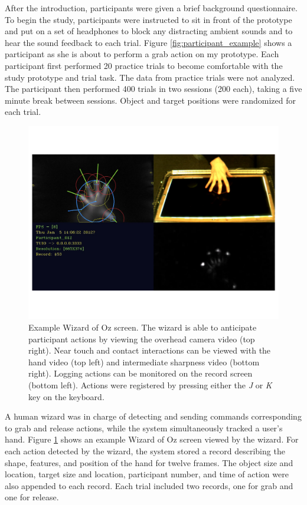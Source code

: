 After the introduction, participants were given a brief background questionnaire.
To begin the study, participants were instructed to sit in front of the prototype and put on a set of headphones to block any distracting ambient sounds and to hear the sound feedback to each trial.
Figure \ref{fig:participant_example} shows a participant as she is about to perform a grab action on my prototype.
Each participant first performed 20 practice trials to become comfortable with the study prototype and trial task.  The data from practice trials were not analyzed.
The participant then performed 400 trials in two sessions (200 each), taking a five minute break between sessions.  Object and target positions were randomized for each trial.
\begin{figure}[h]
 \centering
 \includegraphics[type=pdf,ext=.pdf,read=.pdf,width=5in]{./img/woz_screenshot}
 \caption[Example Wizard of Oz screen.]{
Example Wizard of Oz screen.
The wizard is able to anticipate participant actions by viewing the overhead camera video (top right).
Near touch and contact interactions can be viewed with the hand video (top left) and intermediate sharpness video (bottom right).
Logging actions can be monitored on the record screen (bottom left).
Actions were registered by pressing either the \textit{J} or \textit{K} key on the keyboard.
}
 \label{fig:woz_example}
\end{figure}
A human wizard was in charge of detecting and sending commands corresponding to grab and release actions, while the system simultaneously tracked a user's hand.
Figure \ref{fig:woz_example} shows an example Wizard of Oz screen viewed by the wizard.
For each action detected by the wizard, the system stored a record describing the shape, features, and position of the hand for twelve frames.
The object size and location, target size and location, participant number, and time of action were also appended to each record.
Each trial included two records, one for grab and one for release. 


